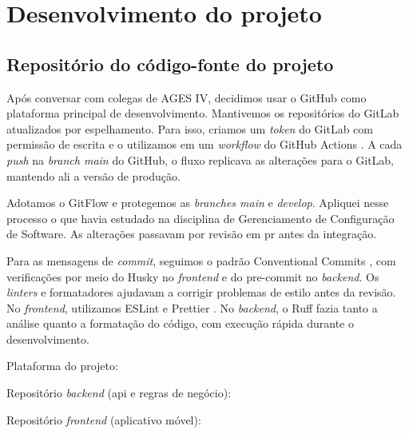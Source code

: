\section[Desenvolvimento do projeto]{Desenvolvimento do projeto}

\subsection{Repositório do código-fonte do projeto}

Após conversar com colegas de AGES IV, decidimos usar o GitHub
\cite{github-docs} como plataforma principal de desenvolvimento. Mantivemos os
repositórios do GitLab \cite{gitlab-docs} atualizados por espelhamento. Para isso,
criamos um \textit{token} do GitLab com permissão de escrita e o utilizamos em um
\textit{workflow} do GitHub Actions \cite{github-actions-docs}. A cada
\textit{push} na \textit{branch main} do GitHub, o fluxo replicava as alterações
para o GitLab, mantendo ali a versão de produção.

Adotamos o GitFlow \cite{atlassian-gitflow} e protegemos as
\textit{branches main} e \textit{develop}. Apliquei nesse processo o que havia estudado na
disciplina de Gerenciamento de Configuração de Software. As alterações passavam
por revisão em \ac{pr} antes da integração.

Para as mensagens de \textit{commit}, seguimos o padrão Conventional Commits
\cite{conventionalcommits}, com
verificações por meio do Husky \cite{husky-docs} no \textit{frontend} e do
pre-commit \cite{pre-commit-docs} no \textit{backend}. Os \textit{linters} e
formatadores ajudavam a corrigir problemas de estilo antes da revisão. No
\textit{frontend}, utilizamos ESLint \cite{eslint-docs} e Prettier
\cite{prettier-docs}. No \textit{backend}, o Ruff \cite{ruff-docs} fazia tanto a
análise quanto a formatação do código, com execução rápida durante o desenvolvimento.

Plataforma do projeto:

{\footnotesize{}}

Repositório \textit{backend} (\ac{api} e regras de negócio):

{\footnotesize{}}

Repositório \textit{frontend} (aplicativo móvel):

{\footnotesize{}}

